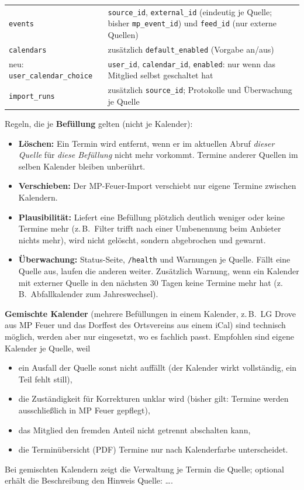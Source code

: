 \documentclass[a4paper,fontsize=10pt]{scrartcl}
\newcommand{\code}[1]{\texttt{#1}}
\begin{document}
\begin{center}
\begin{tabularx}{\textwidth}{L{3.6cm}X}
\addlinespace
\code{events} & \code{source\_id}, \code{external\_id} (eindeutig je
  Quelle; bisher \code{mp\_event\_id}) und \code{feed\_id} (nur externe
  Quellen) \\
\addlinespace
\code{calendars} & zusätzlich \code{default\_enabled} (Vorgabe an/aus) \\
\addlinespace
neu: \code{user\_calendar\_choice} & \code{user\_id}, \code{calendar\_id},
  \code{enabled}: nur wenn das Mitglied selbst geschaltet hat \\
\addlinespace
\code{import\_runs} & zusätzlich \code{source\_id}; Protokolle und
  Überwachung je Quelle \\
\bottomrule
\end{tabularx}
\end{center}

Regeln, die je \textbf{Befüllung} gelten (nicht je Kalender):

\begin{itemize}
  \item \textbf{Löschen:} Ein Termin wird entfernt, wenn er im aktuellen
        Abruf \emph{dieser Quelle} für \emph{diese Befüllung} nicht mehr
        vorkommt. Termine anderer Quellen im selben Kalender bleiben
        unberührt.
  \item \textbf{Verschieben:} Der MP-Feuer-Import verschiebt nur eigene
        Termine zwischen Kalendern.
  \item \textbf{Plausibilität:} Liefert eine Befüllung plötzlich deutlich
        weniger oder keine Termine mehr (z.\,B.\ Filter trifft nach einer
        Umbenennung beim Anbieter nichts mehr), wird nicht gelöscht, sondern
        abgebrochen und gewarnt.
  \item \textbf{Überwachung:} Status-Seite, \code{/health} und Warnungen je
        Quelle. Fällt eine Quelle aus, laufen die anderen weiter.
        Zusätzlich Warnung, wenn ein Kalender mit externer Quelle in den
        nächsten 30 Tagen keine Termine mehr hat (z.\,B.\ Abfallkalender zum
        Jahreswechsel).
\end{itemize}

\textbf{Gemischte Kalender} (mehrere Befüllungen in einem Kalender, z.\,B.\
LG Drove aus MP Feuer und das Dorffest des Ortsvereins aus einem iCal) sind
technisch möglich, werden aber nur eingesetzt, wo es fachlich passt.
Empfohlen sind eigene Kalender je Quelle, weil
\begin{itemize}
  \item ein Ausfall der Quelle sonst nicht auffällt (der Kalender wirkt
        vollständig, ein Teil fehlt still),
  \item die Zuständigkeit für Korrekturen unklar wird (bisher gilt:
        Termine werden ausschließlich in MP Feuer gepflegt),
  \item das Mitglied den fremden Anteil nicht getrennt abschalten kann,
  \item die Terminübersicht (PDF) Termine nur nach Kalenderfarbe
        unterscheidet.
\end{itemize}
Bei gemischten Kalendern zeigt die Verwaltung je Termin die Quelle; optional
erhält die Beschreibung den Hinweis \glqq Quelle: \dots\grqq.
\end{document}
